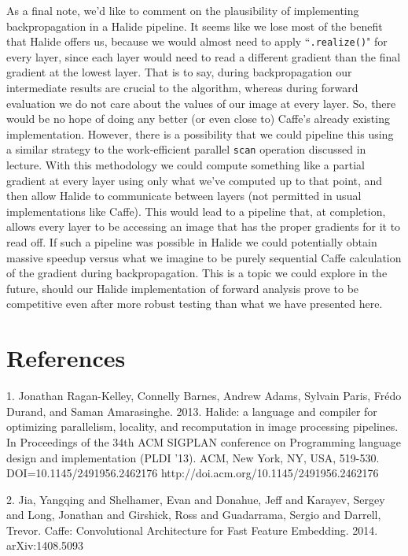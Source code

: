 \documentclass[11pt,twoside]{article}
\begin{document}
As a final note, we'd like to comment on the plausibility of implementing backpropagation in a Halide pipeline.  It seems like we lose most of the benefit that Halide offers us, because we would almost need to apply ``\texttt{.realize()}" for every layer, since each layer would need to read a different gradient than the final gradient at the lowest layer.  That is to say, during backpropagation our intermediate results are crucial to the algorithm, whereas during forward evaluation we do not care about the values of our image at every layer.  So, there would be no hope of doing any better (or even close to) Caffe's already existing implementation.  However, there is a possibility that we could pipeline this using a similar strategy to the work-efficient parallel \texttt{scan} operation discussed in lecture.  With this methodology we could compute something like a partial gradient at every layer using only what we've computed up to that point, and then allow Halide to communicate between layers (not permitted in usual implementations like Caffe).  This would lead to a pipeline that, at completion, allows every layer to be accessing an image that has the proper gradients for it to read off.  If such a pipeline was possible in Halide we could potentially obtain massive speedup versus what we imagine to be purely sequential Caffe calculation of the gradient during backpropagation.  This is a topic we could explore in the future, should our Halide implementation of forward analysis prove to be competitive even after more robust testing than what we have presented here.

\section{References}

1.  Jonathan Ragan-Kelley, Connelly Barnes, Andrew Adams, Sylvain Paris, Frédo Durand, and Saman Amarasinghe. 2013. Halide: a language and compiler for optimizing parallelism, locality, and recomputation in image processing pipelines. In Proceedings of the 34th ACM SIGPLAN conference on Programming language design and implementation (PLDI '13). ACM, New York, NY, USA, 519-530. DOI=10.1145/2491956.2462176 http://doi.acm.org/10.1145/2491956.2462176

2.  Jia, Yangqing and Shelhamer, Evan and Donahue, Jeff and Karayev, Sergey and Long, Jonathan and Girshick, Ross and Guadarrama, Sergio and Darrell, Trevor.  Caffe: Convolutional Architecture for Fast Feature Embedding.  2014.  arXiv:1408.5093
\end{document}
